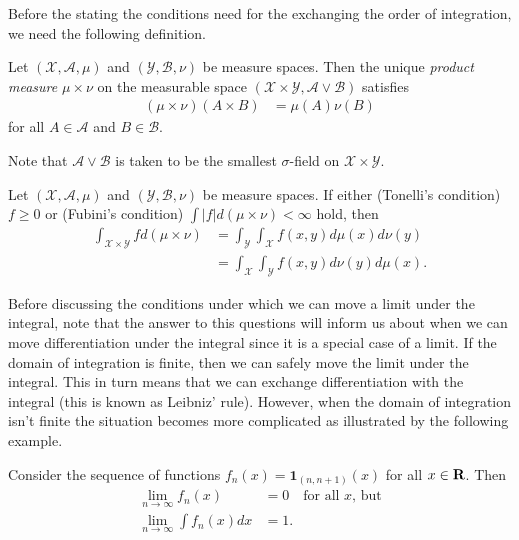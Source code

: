 \documentclass[twoside]{article}
\begin{document}
Before the stating the conditions need for the exchanging the order of integration,
we need the following definition.
\begin{definition} Let $(\mathcal X, \mathcal A, \mu)$ and $(\mathcal Y, \mathcal B, \nu)$
  be measure spaces.  Then the unique \emph{product measure} $\mu \times \nu$ on
  the measurable space $(\mathcal X \times \mathcal Y, \mathcal A \vee \mathcal B)$ satisfies
  \begin{align*}
    (\mu \times \nu)(A\times B) &= \mu(A)\nu(B)
  \end{align*}
  for all $A \in  \mathcal A$ and $B \in \mathcal B$.
\end{definition}
Note that $\mathcal A \vee \mathcal B$ is taken to be the smallest $\sigma$-field on
$\mathcal X \times \mathcal Y$.
\begin{theorem}\citep[Theorem 1.7, p.~13]{keener}
  Let $(\mathcal X, \mathcal A, \mu)$ and $(\mathcal Y, \mathcal B, \nu)$
  be measure spaces.  If either (Tonelli's condition) $f \geq 0$ or (Fubini's
  condition) $\int |f| d(\mu \times \nu) < \infty$  hold, then
  \begin{align*}
    \int_{\mathcal X \times \mathcal Y} f d(\mu \times \nu) &= \int_{\mathcal Y} \int_{\mathcal X} f(x, y) d\mu(x) d\nu(y) \\
    &= \int_{\mathcal X} \int_{\mathcal Y} f(x, y) d\nu(y) d\mu(x).
  \end{align*}
\end{theorem}

Before discussing the conditions under which we can move a limit under the
integral, note that the answer to this questions will inform us about when we
can move differentiation under the integral since it is a special case of a
limit.  If the domain of integration is finite, then we can safely move the
limit under the integral.  This in turn means that we can exchange
differentiation with the integral (this is known as Leibniz' rule).  However,
when the domain of integration isn't finite the situation becomes more
complicated as illustrated by the following example.

\begin{example}
Consider the sequence of functions $f_n(x) = \mathbf{1}_{(n, n+1)}(x)$ for all
$x \in \mathbf{R}$.  Then
\begin{align*}
  \lim_{n \rightarrow \infty} f_n(x) &= 0 \quad \text{for all $x$, but}\\
  \lim_{n \rightarrow \infty} \int f_n(x) dx &= 1.
\end{align*}
\end{example}
\end{document}
